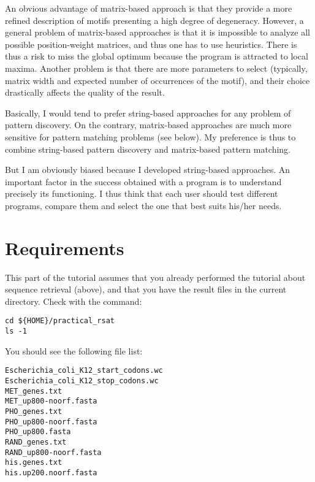 An obvious advantage of matrix-based approach is that they provide a
more refined description of motifs presenting a high degree of
degeneracy. However, a general problem of matrix-based approaches is
that it is impossible to analyze all possible position-weight
matrices, and thus one has to use heuristics. There is thus a risk to
miss the global optimum because the program is attracted to local
maxima. Another problem is that there are more parameters to select
(typically, matrix width and expected number of occurrences of the
motif), and their choice drastically affects the quality of the
result.

Basically, I would tend to prefer string-based approaches for any
problem of pattern discovery. On the contrary, matrix-based approaches
are much more sensitive for pattern matching problems (see below). My
preference is thus to combine string-based pattern discovery and
matrix-based pattern matching.

But I am obviously biased because I developed string-based
approaches. An important factor in the success obtained with a program
is to understand precisely its functioning. I thus think that each
user should test different programs, compare them and select the one
that best suits his/her needs.

\section{Requirements}

This part of the tutorial assumes that you already performed the
tutorial about sequence retrieval (above), and that you have the
result files in the current directory. Check with the command:

{\color{Blue} \begin{footnotesize} 
\begin{verbatim}
cd ${HOME}/practical_rsat
ls -1
\end{verbatim} \end{footnotesize}
}


You should see the following file list:
{\color{OliveGreen} \begin{footnotesize} 
\begin{verbatim}
Escherichia_coli_K12_start_codons.wc
Escherichia_coli_K12_stop_codons.wc
MET_genes.txt
MET_up800-noorf.fasta
PHO_genes.txt
PHO_up800-noorf.fasta
PHO_up800.fasta
RAND_genes.txt
RAND_up800-noorf.fasta
his.genes.txt
his.up200.noorf.fasta
\end{verbatim} \end{footnotesize}
}

